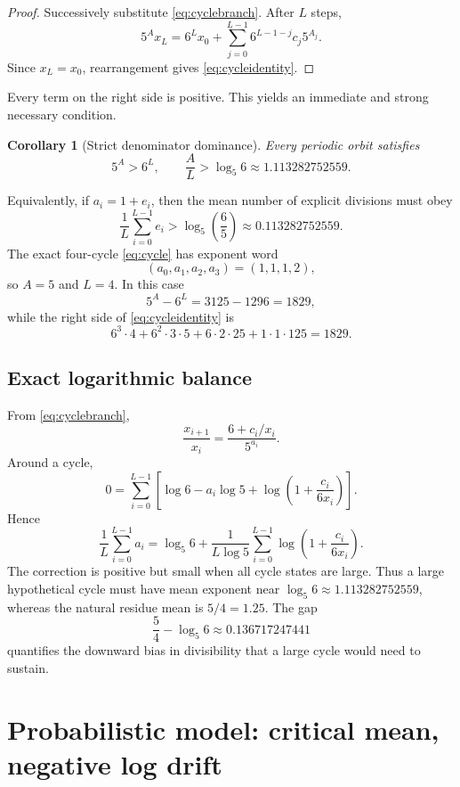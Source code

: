 \documentclass[11pt]{article}
\newtheorem{corollary}[theorem]{Corollary}
\theoremstyle{definition}
\begin{document}
\begin{proof}
Successively substitute \eqref{eq:cyclebranch}. After $L$ steps,
\[
5^A x_L
=
6^Lx_0+
\sum_{j=0}^{L-1}6^{L-1-j}c_j5^{A_j}.
\]
Since $x_L=x_0$, rearrangement gives \eqref{eq:cycleidentity}.
\end{proof}

Every term on the right side is positive. This yields an immediate and strong necessary condition.

\begin{corollary}[Strict denominator dominance]
Every periodic orbit satisfies
\begin{equation}
5^A>6^L,
\qquad
\frac AL>\log_5 6\approx 1.113282752559.
\label{eq:cyclethreshold}
\end{equation}
\end{corollary}

Equivalently, if $a_i=1+e_i$, then the mean number of explicit divisions must obey
\[
\frac1L\sum_{i=0}^{L-1}e_i
>
\log_5\!\left(\frac65\right)
\approx 0.113282752559.
\]
The exact four-cycle \eqref{eq:cycle} has exponent word
\[
(a_0,a_1,a_2,a_3)=(1,1,1,2),
\]
so $A=5$ and $L=4$. In this case
\[
5^A-6^L=3125-1296=1829,
\]
while the right side of \eqref{eq:cycleidentity} is
\[
6^3\cdot4
+6^2\cdot3\cdot5
+6\cdot2\cdot25
+1\cdot1\cdot125
=1829.
\]

\subsection{Exact logarithmic balance}

From \eqref{eq:cyclebranch},
\[
\frac{x_{i+1}}{x_i}
=
\frac{6+c_i/x_i}{5^{a_i}}.
\]
Around a cycle,
\begin{equation}
0
=
\sum_{i=0}^{L-1}
\left[
\log6-a_i\log5+
\log\!\left(1+\frac{c_i}{6x_i}\right)
\right].
\label{eq:logbalance}
\end{equation}
Hence
\begin{equation}
\frac1L\sum_{i=0}^{L-1}a_i
=
\log_5 6+
\frac1{L\log5}
\sum_{i=0}^{L-1}
\log\!\left(1+\frac{c_i}{6x_i}\right).
\label{eq:amean-cycle}
\end{equation}
The correction is positive but small when all cycle states are large. Thus a large hypothetical cycle must have mean exponent near $\log_5 6\approx1.113282752559$, whereas the natural residue mean is $5/4=1.25$. The gap
\[
\frac54-\log_5 6\approx 0.136717247441
\]
quantifies the downward bias in divisibility that a large cycle would need to sustain.

\section{Probabilistic model: critical mean, negative log drift}
\end{document}
